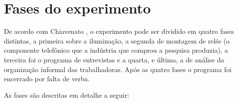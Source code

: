 \section{
    Fases do experimento
    }

\setlength{\parindent}{4em}
\setlength{\parskip}{0.5em}
\renewcommand{\baselinestretch}{1}

De acordo com Chiavenato \cite{chiavenato2003introduccao}, o experimento pode ser dividido em quatro fases distintas, a primeira sobre a iluminação, a segunda de montagem de relés (o componente telefônico que a indústria que comprou a pesquisa produzia), a terceira foi o programa de entrevistas e a quarta, e última, a de análise da organização informal das trabalhadoras. Após as quatro fases o programa foi encerrado por falta de verba.

As fases são descritas em detalhe a seguir:

